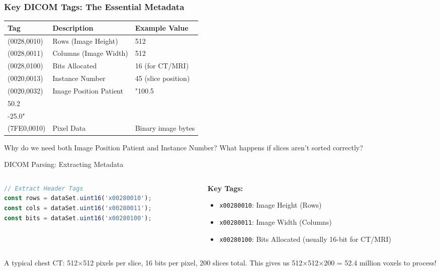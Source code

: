 \begin{frame}
\frametitle{Key DICOM Tags: The Essential Metadata}

\begin{table}
\small
\centering
{}
\begin{tabular}{@{}lll@{}}
\toprule
\textbf{Tag} & \textbf{Description} & \textbf{Example Value} \\
\midrule
(0028,0010) & Rows (Image Height) & 512 \\
(0028,0011) & Columns (Image Width) & 512 \\
(0028,0100) & Bits Allocated & 16 (for CT/MRI) \\
(0020,0013) & Instance Number & 45 (slice position) \\
(0020,0032) & Image Position Patient & "100.5\\50.2\\-25.0" \\
(7FE0,0010) & Pixel Data & Binary image bytes \\
\bottomrule
\end{tabular}
\end{table}

\vspace{0.5cm}
Why do we need both Image Position Patient and Instance Number? What happens if slices aren't sorted correctly?
\end{frame}

\begin{frame}[fragile]{DICOM Parsing: Extracting Metadata}
\begin{columns}
\begin{column}{0.5\textwidth}
\begin{lstlisting}[language=JavaScript]
// Extract Header Tags
const rows = dataSet.uint16('x00280010');
const cols = dataSet.uint16('x00280011');
const bits = dataSet.uint16('x00280100');
\end{lstlisting}
\end{column}
\begin{column}{0.5\textwidth}
\small
\textbf{Key Tags:}
\begin{itemize}
    \item \texttt{x00280010}: Image Height (Rows)
    \item \texttt{x00280011}: Image Width (Columns)
    \item \texttt{x00280100}: Bits Allocated (usually 16-bit for CT/MRI)
\end{itemize}
\end{column}
\end{columns}

A typical chest CT: 512×512 pixels per slice, 16 bits per pixel, 200 slices total. This gives us 512×512×200 = 52.4 million voxels to process!
\end{frame}

